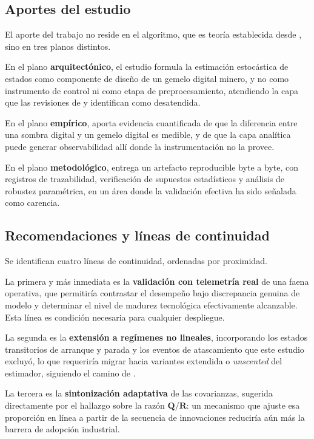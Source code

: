 \subsection{Aportes del estudio}

El aporte del trabajo no reside en el algoritmo, que es teoría establecida desde
\textcite{kalman1960}, sino en tres planos distintos.

En el plano \textbf{arquitectónico}, el estudio formula la estimación estocástica
de estados como componente de diseño de un gemelo digital minero, y no como
instrumento de control ni como etapa de preprocesamiento, atendiendo la capa que
las revisiones de \textcite{qu2023} y \textcite{ebad2026} identifican como
desatendida.

En el plano \textbf{empírico}, aporta evidencia cuantificada de que la
diferencia entre una sombra digital y un gemelo digital es medible, y de que la
capa analítica puede generar observabilidad allí donde la instrumentación no la
provee.

En el plano \textbf{metodológico}, entrega un artefacto reproducible byte a
byte, con registros de trazabilidad, verificación de supuestos estadísticos y
análisis de robustez paramétrica, en un área donde la validación efectiva ha sido
señalada como carencia.

\subsection{Recomendaciones y líneas de continuidad}

Se identifican cuatro líneas de continuidad, ordenadas por proximidad.

La primera y más inmediata es la \textbf{validación con telemetría real} de una
faena operativa, que permitiría contrastar el desempeño bajo discrepancia
genuina de modelo y determinar el nivel de madurez tecnológica efectivamente
alcanzable. Esta línea es condición necesaria para cualquier despliegue.

La segunda es la \textbf{extensión a regímenes no lineales}, incorporando los
estados transitorios de arranque y parada y los eventos de atascamiento que este
estudio excluyó, lo que requeriría migrar hacia variantes extendida o
\emph{unscented} del estimador, siguiendo el camino de \textcite{barzaga2025}.

La tercera es la \textbf{sintonización adaptativa} de las covarianzas, sugerida
directamente por el hallazgo sobre la razón $\mathbf{Q}/\mathbf{R}$: un
mecanismo que ajuste esa proporción en línea a partir de la secuencia de
innovaciones reduciría aún más la barrera de adopción industrial.

